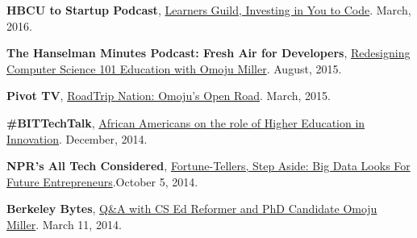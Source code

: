 \documentclass[11pt,article,oneside]{memoir}
\begin{document}
\ind \textbf{HBCU to Startup Podcast}, \href{https://www.youtube.com/watch?v=T0wQRr4RuqM&ab_channel=HBCUtoStartup}{Learners Guild, Investing in You to Code}. March, 2016.

\ind \textbf{The Hanselman Minutes Podcast: Fresh Air for Developers}, \href{http://hanselminutes.com/488/redesigning-computer-science-101-education-with-omoju-miller}{Redesigning Computer Science 101 Education with Omoju Miller}. August, 2015.

\ind \textbf{Pivot TV}, \href{http://roadtripnation.com/leader/omoju-miller}{RoadTrip Nation: Omoju's Open Road}. March, 2015.

\ind \textbf{\#BITTechTalk}, \href{https://www.blacksintechnology.net/the-road-to-50-podcast-african-americans-on-the-role-of-higher-education-in-innovation/}{African Americans on the role of Higher Education in Innovation}. December, 2014.

\ind \textbf{NPR's  All Tech Considered}, \href{http://www.npr.org/sections/alltechconsidered/2014/10/05/351851015/fortune-tellers-step-aside-big-data-looks-for-future-entrepreneurs}{Fortune-Tellers, Step Aside: Big Data Looks For Future Entrepreneurs}.October 5, 2014.

\ind \textbf{Berkeley Bytes}, \href{http://best.berkeley.edu/2015/03/11/best-labber-in-berkeley-byte-qa-with-cs-ed-reformer-and-phd-candidate-omoju-miller/}{Q\&A with CS Ed Reformer and PhD Candidate Omoju Miller}. March 11, 2014.
\end{document}
